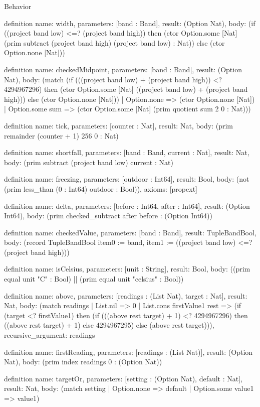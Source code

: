 \begin{lexlean}{Behavior}
\begin{semanticmodule}
definition{
  name: width,
  parameters: [band : Band],
  result: (Option Nat),
  body: (if ((project band low) <=? (project band high)) then (ctor Option.some [Nat] (prim subtract (project band high) (project band low) : Nat)) else (ctor Option.none [Nat]))
}

definition{
  name: checkedMidpoint,
  parameters: [band : Band],
  result: (Option Nat),
  body: (match (if (((project band low) + (project band high)) <? 4294967296) then (ctor Option.some [Nat] ((project band low) + (project band high))) else (ctor Option.none [Nat]))
    | Option.none => (ctor Option.none [Nat])
    | Option.some sum => (ctor Option.some [Nat] (prim quotient sum 2 0 : Nat)))
}

definition{
  name: tick,
  parameters: [counter : Nat],
  result: Nat,
  body: (prim remainder (counter + 1) 256 0 : Nat)
}

definition{
  name: shortfall,
  parameters: [band : Band, current : Nat],
  result: Nat,
  body: (prim subtract (project band low) current : Nat)
}

definition{
  name: freezing,
  parameters: [outdoor : Int64],
  result: Bool,
  body: (not (prim less_than (0 : Int64) outdoor : Bool)),
  axioms: [propext]
}

definition{
  name: delta,
  parameters: [before : Int64, after : Int64],
  result: (Option Int64),
  body: (prim checked_subtract after before : (Option Int64))
}

definition{
  name: checkedValue,
  parameters: [band : Band],
  result: TupleBandBool,
  body: (record TupleBandBool {item0 := band, item1 := ((project band low) <=? (project band high))})
}

definition{
  name: isCelsius,
  parameters: [unit : String],
  result: Bool,
  body: ((prim equal unit "C" : Bool) || (prim equal unit "celsius" : Bool))
}

definition{
  name: above,
  parameters: [readings : (List Nat), target : Nat],
  result: Nat,
  body: (match readings
    | List.nil => 0
    | List.cons firstValue1 rest => (if (target <? firstValue1) then (if (((above rest target) + 1) <? 4294967296) then ((above rest target) + 1) else 4294967295) else (above rest target))),
  recursive_argument: readings
}

definition{
  name: firstReading,
  parameters: [readings : (List Nat)],
  result: (Option Nat),
  body: (prim index readings 0 : (Option Nat))
}

definition{
  name: targetOr,
  parameters: [setting : (Option Nat), default : Nat],
  result: Nat,
  body: (match setting | Option.none => default | Option.some value1 => value1)
}


\end{semanticmodule}
\end{lexlean}
